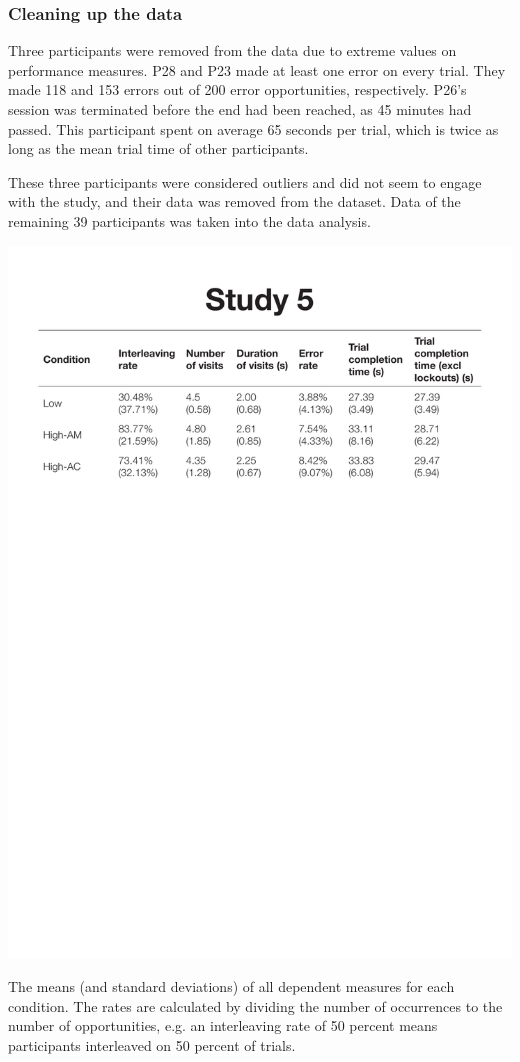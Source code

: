 \subsubsection{Cleaning up the data}
Three participants were removed from the data due to extreme values on performance measures.
P28 and P23 made at least one error on every trial. They made 118 and 153 errors out of 200 error opportunities, respectively. P26's session was terminated before the end had been reached, as 45 minutes had passed. This participant spent on average 65 seconds per trial, which is twice as long as the mean trial time of other participants.

These three participants were considered outliers and did not seem to engage with the study, and their data was removed from the dataset. Data of the remaining 39 participants was taken into the data analysis.

\begin{table}
 \includegraphics[width=\textwidth]{images/ch34/ch34_5-means.pdf}
\caption[Study 5 means and SDs of dependent measures]{The means (and standard deviations) of all dependent measures for each condition. The rates are calculated by dividing the number of occurrences to the number of opportunities, e.g. an interleaving rate of 50 percent means participants interleaved on 50 percent of trials.}
\label{tbl:ch34_5-means}
\end{table}

